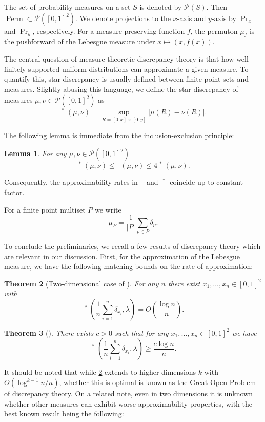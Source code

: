 \documentclass{article}
\newcommand{\Perm}{\mathop{\mathrm{Perm}}}
\newcommand{\ds}{\mathop{d_\square}}
\newtheorem{theorem}{Theorem}[section]
\newtheorem{lemma}[theorem]{Lemma}
\theoremstyle{definition}
\begin{document}
The set of probability measures on a set $S$ is denoted by $\mathcal{P}(S)$. Then $\Perm\subset \mathcal{P}([0, 1]^2)$. We denote projections to the $x$-axis and $y$-axis by $\Pr_x$ and $\Pr_y$, respectively. For a measure-preserving function $f$, the permuton \(\mu_f\) is the pushforward of the Lebesgue measure under \(x\mapsto(x,f(x))\).

The central question of measure-theoretic discrepancy theory is that how well finitely supported uniform distributions can approximate a given measure. To quantify this, star discrepancy is usually defined between finite point sets and measures. Slightly abusing this language, we define the star discrepancy of measures $\mu, \nu \in \mathcal{P}([0, 1]^2)$ as
$${\ds}^*(\mu, \nu)=\sup_{R=[0, x]\times [0, y]}|\mu(R)-\nu(R)|.$$

The following lemma is immediate from the inclusion-exclusion principle:

\begin{lemma}
    For any $\mu, \nu \in \mathcal{P}([0, 1]^2)$
    $${\ds}^* (\mu, \nu) \leq {\ds}(\mu, \nu)\leq 4{\ds}^*(\mu, \nu).$$
\end{lemma}

Consequently, the approximability rates in $\ds$ and $\ds^*$ coincide up to constant factor.

For a finite point multiset $P$ we write
$$\mu_P = \frac{1}{|P|}\sum_{p\in P}\delta_p.$$

To conclude the preliminaries, we recall a few results of discrepancy theory which are relevant in our discussion. First, for the approximation of the Lebesgue measure, we have the following matching bounds on the rate of approximation:

\begin{theorem}[Two-dimensional case of {\cite{Halton1960}}]\label{thm:halton}
    For any  $n$ there exist $x_1, \dots, x_n\in [0, 1]^2$ with
    $${\ds}^*\left(\frac{1}{n}\sum_{i=1}^{n}\delta_{x_i}, \lambda\right)= O\left(\frac{\log n}{n}\right).$$
\end{theorem}

\begin{theorem}[{\cite[Theorem~2]{Schmidt_1972}}]\label{thm:schmidt}
    There exists $c>0$ such that for any $x_1, \dots, x_n\in [0, 1]^2$ we have
    $${\ds}^*\left(\frac{1}{n}\sum_{i=1}^{n}\delta_{x_i}, \lambda\right)\geq \frac{c\log n}{n}.$$
\end{theorem}

It should be noted that while \ref{thm:halton} extends to higher dimensions $k$ with $O(\log^{k-1}{n}/n)$, whether this is optimal is known as the Great Open Problem of discrepancy theory. On a related note, even in two dimensions it is unknown whether other measures can exhibit worse approximability properties, with the best known result being the following:
\end{document}
